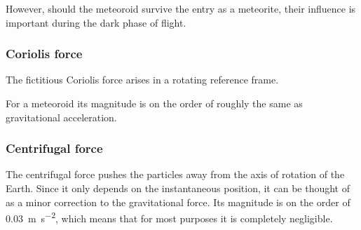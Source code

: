        However, should the meteoroid survive the entry as a meteorite, their influence is important during the dark phase of flight.

            \subsubsection{Coriolis force} \label{aafC}
                The fictitious Coriolis force arises in a rotating reference frame.

                For a meteoroid its magnitude is on the order of
                roughly the same as gravitational acceleration.

            \subsubsection{Centrifugal force} \label{aafc}
                The centrifugal force pushes the particles away from the axis of rotation of the Earth.
            Since it only depends on the instantaneous position, it can be thought of as a minor correction to the
            gravitational force. Its magnitude is on the order of \SI{0.03}{\metre\per\second\squared}, which
            means that for most purposes it is completely negligible.
